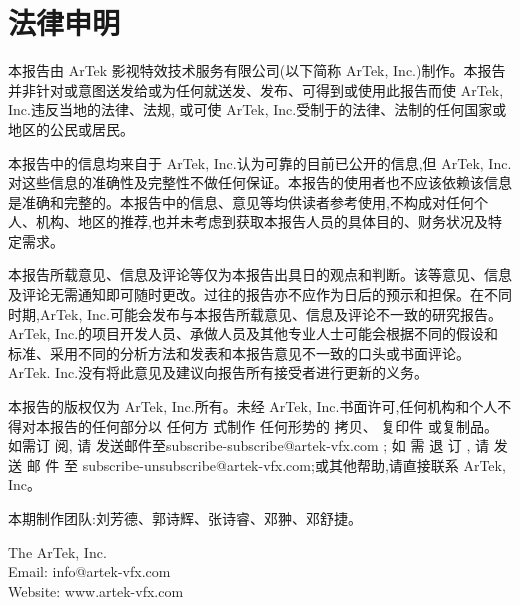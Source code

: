 \chapter*{法律申明}
本报告由 ArTek 影视特效技术服务有限公司(以下简称 ArTek, Inc.)制作。本报告并非针对或意图送发给或为任何就送发、发布、可得到或使用此报告而使 ArTek, Inc.违反当地的法律、法规, 或可使 ArTek, Inc.受制于的法律、法制的任何国家或地区的公民或居民。

本报告中的信息均来自于 ArTek, Inc.认为可靠的目前已公开的信息,但 ArTek, Inc.对这些信息的准确性及完整性不做任何保证。本报告的使用者也不应该依赖该信息是准确和完整的。本报告中的信息、意见等均供读者参考使用,不构成对任何个人、机构、地区的推荐,也并未考虑到获取本报告人员的具体目的、财务状况及特定需求。

本报告所载意见、信息及评论等仅为本报告出具日的观点和判断。该等意见、信息及评论无需通知即可随时更改。过往的报告亦不应作为日后的预示和担保。在不同时期,ArTek, Inc.可能会发布与本报告所载意见、信息及评论不一致的研究报告。ArTek, Inc.的项目开发人员、承做人员及其他专业人士可能会根据不同的假设和标准、采用不同的分析方法和发表和本报告意见不一致的口头或书面评论。ArTek. Inc.没有将此意见及建议向报告所有接受者进行更新的义务。

本报告的版权仅为 ArTek, Inc.所有。未经 ArTek, Inc.书面许可,任何机构和个人不得对本报告的任何部分以 任何方 式制作 任何形势的 拷贝、 复印件 或复制品。 如需订 阅, 请 发送邮件至subscribe-subscribe@artek-vfx.com ; 如 需 退 订 , 请 发 送 邮 件 至 subscribe-unsubscribe@artek-vfx.com;或其他帮助,请直接联系 ArTek, Inc。

本期制作团队:刘芳德、郭诗辉、张诗睿、邓翀、邓舒捷。

\begin{flushright}
The ArTek, Inc.\\
Email: info@artek-vfx.com\\
Website: www.artek-vfx.com\\
\end{flushright}

